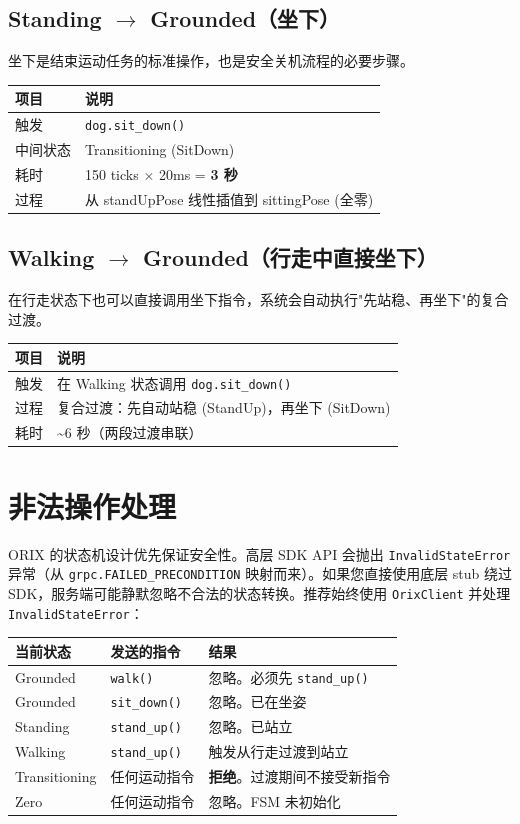 \documentclass[a4paper,11pt,openany]{book}
\begin{document}
\subsection{Standing $\to$ Grounded（坐下）}

坐下是结束运动任务的标准操作，也是安全关机流程的必要步骤。

\begin{longtable}{ll}
\toprule
项目 & 说明 \\
\midrule
\endhead
触发 & \texttt{dog.sit\_down()} \\
中间状态 & Transitioning (SitDown) \\
耗时 & 150 ticks $\times$ 20ms = \textbf{3 秒} \\
过程 & 从 standUpPose 线性插值到 sittingPose (全零) \\
\bottomrule
\end{longtable}

\subsection{Walking $\to$ Grounded（行走中直接坐下）}

在行走状态下也可以直接调用坐下指令，系统会自动执行"先站稳、再坐下"的复合过渡。

\begin{longtable}{ll}
\toprule
项目 & 说明 \\
\midrule
\endhead
触发 & 在 Walking 状态调用 \texttt{dog.sit\_down()} \\
过程 & 复合过渡：先自动站稳 (StandUp)，再坐下 (SitDown) \\
耗时 & \textasciitilde 6 秒（两段过渡串联） \\
\bottomrule
\end{longtable}

\section{非法操作处理}

ORIX 的状态机设计优先保证安全性。高层 SDK API 会抛出 \texttt{InvalidStateError} 异常（从 \texttt{grpc.FAILED\_PRECONDITION} 映射而来）。如果您直接使用底层 stub 绕过 SDK，服务端可能静默忽略不合法的状态转换。推荐始终使用 \texttt{OrixClient} 并处理 \texttt{InvalidStateError}：

\begin{longtable}{lll}
\toprule
当前状态 & 发送的指令 & 结果 \\
\midrule
\endhead
Grounded & \texttt{walk()} & 忽略。必须先 \texttt{stand\_up()} \\
Grounded & \texttt{sit\_down()} & 忽略。已在坐姿 \\
Standing & \texttt{stand\_up()} & 忽略。已站立 \\
Walking & \texttt{stand\_up()} & 触发从行走过渡到站立 \\
Transitioning & 任何运动指令 & \textbf{拒绝}。过渡期间不接受新指令 \\
Zero & 任何运动指令 & 忽略。FSM 未初始化 \\
\bottomrule
\end{longtable}
\end{document}
